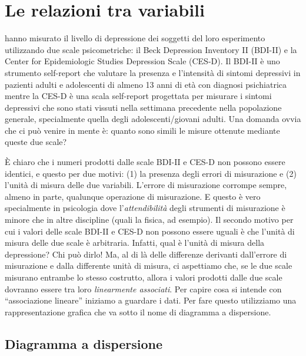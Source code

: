 \documentclass[
  11pt,
  italian,
  a4paper,
  extrafontsizes,onecolumn,openright
  ]{memoir}
\theoremstyle{definition}
\theoremstyle{definition}
\theoremstyle{definition}
\theoremstyle{definition}
\theoremstyle{remark}
\begin{document}
\hypertarget{le-relazioni-tra-variabili}{%
\section{Le relazioni tra variabili}\label{le-relazioni-tra-variabili}}

\textcite{zetschefuture2019} hanno misurato il livello di depressione dei
soggetti del loro esperimento utilizzando due scale psicometriche: il
Beck Depression Inventory II (BDI-II) e la Center for Epidemiologic
Studies Depression Scale (CES-D). Il BDI-II è uno strumento self-report
che valutare la presenza e l'intensità di sintomi depressivi in pazienti
adulti e adolescenti di almeno 13 anni di età con diagnosi psichiatrica
mentre la CES-D è una scala self-report progettata per misurare i
sintomi depressivi che sono stati vissuti nella settimana precedente
nella popolazione generale, specialmente quella degli
adolescenti/giovani adulti. Una domanda ovvia che ci può venire in
mente è: quanto sono simili le misure ottenute mediante queste due
scale?

È chiaro che i numeri prodotti dalle scale BDI-II e CES-D non possono
essere identici, e questo per due motivi: (1) la presenza degli errori
di misurazione e (2) l'unità di misura delle due variabili. L'errore di
misurazione corrompe sempre, almeno in parte, qualunque operazione di
misurazione. E questo è vero specialmente in psicologia dove
l'\emph{attendibilità} degli strumenti di misurazione è minore che in altre
discipline (quali la fisica, ad esempio). Il secondo motivo per cui i
valori delle scale BDI-II e CES-D non possono essere uguali è che
l'unità di misura delle due scale è arbitraria. Infatti, qual è l'unità
di misura della depressione? Chi può dirlo! Ma, al di là delle
differenze derivanti dall'errore di misurazione e dalla differente unità
di misura, ci aspettiamo che, se le due scale misurano entrambe lo
stesso costrutto, allora i valori prodotti dalle due scale dovranno
essere tra loro \emph{linearmente associati}. Per capire cosa si intende con
``associazione lineare'' iniziamo a guardare i dati. Per fare questo
utilizziamo una rappresentazione grafica che va sotto il nome di
diagramma a dispersione.

\hypertarget{diagramma-a-dispersione}{%
\subsection{Diagramma a dispersione}\label{diagramma-a-dispersione}}
\end{document}
